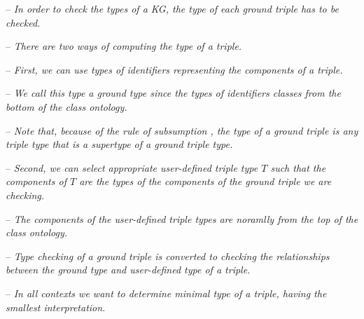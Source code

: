 \documentclass[runningheads]{llncs}
\newcommand{\notes}[1]{\noindent\begin{small}-- \emph{#1}\hfill\break\end{small}}
\newcommand{\nnotes}[1]{\indent\begin{small}-- \emph{#1}\hfill\break\end{small}}
\begin{document}
\notes{In order to check the types of a KG, the type of each ground triple has to be checked.}
\notes{There are two ways of computing the type of a triple.}
\notes{First, we can use types of identifiers representing the components of a triple.}
\nnotes{We call this type a \emph{ground type} since the types of identifiers classes from the bottom of the class ontology.}
\nnotes{Note that, because of the rule of subsumption \cite{Pierce2002}, the type of a ground triple is any triple type that is a supertype of a ground triple type.}
\notes{Second, we can select appropriate user-defined triple type $T$ such that the components of $T$ are the types of the components of the ground triple we are checking.}
\nnotes{The components of the user-defined triple types are noramlly from the top of the class ontology.}
\nnotes{Type checking of a ground triple is converted to checking the relationships between the ground type and user-defined type of a triple.} 
\notes{In all contexts we want to determine \emph{minimal type} of a triple, having the smallest interpretation.}

  

\end{document}
